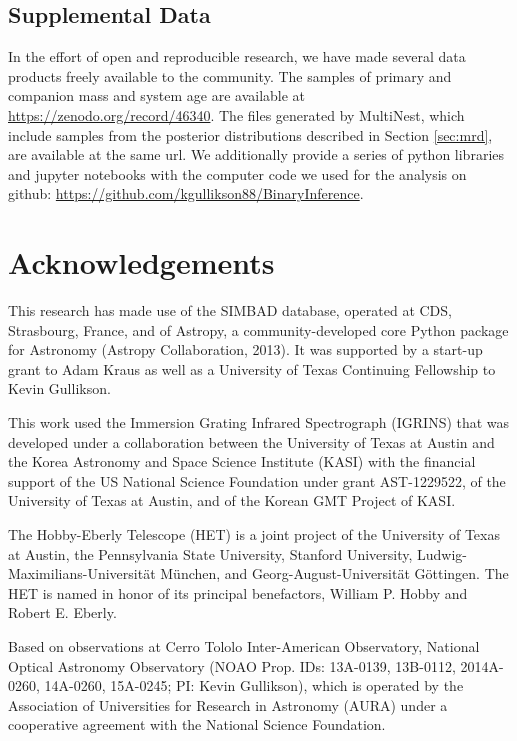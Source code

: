 \documentclass{emulateapj}
\begin{document}
\subsection{Supplemental Data}

In the effort of open and reproducible research, we have made several data products freely available to the community. The samples of primary and companion mass and system age are available at \url{https://zenodo.org/record/46340}. The files generated by MultiNest, which include samples from the posterior distributions described in Section \ref{sec:mrd}, are available at the same url. We additionally provide a series of python libraries and jupyter notebooks with the computer code we used for the analysis on github: \url{https://github.com/kgullikson88/BinaryInference}.




\section*{Acknowledgements}
This research has made use of the SIMBAD database, operated at CDS, Strasbourg, France, and of Astropy, a community-developed core Python package for Astronomy (Astropy Collaboration, 2013).
It was supported by a start-up grant to Adam Kraus as well as a University of Texas Continuing Fellowship to Kevin Gullikson.

This work used the Immersion Grating Infrared Spectrograph (IGRINS) that was developed under a collaboration between the University of Texas at Austin and the Korea Astronomy and Space Science Institute (KASI) with the financial support of the US National Science Foundation under grant AST-1229522, of the University of Texas at Austin, and of the Korean GMT Project of KASI.

The Hobby-Eberly Telescope (HET) is a joint project of the University of Texas at Austin, the Pennsylvania State University, Stanford University, Ludwig-Maximilians-Universit\"at M\"unchen, and Georg-August-Universit\"at G\"ottingen. The HET is named in honor of its principal benefactors, William P. Hobby and Robert E. Eberly.

Based on observations at Cerro Tololo Inter-American Observatory, National Optical Astronomy Observatory (NOAO Prop. IDs: 13A-0139, 13B-0112, 2014A-0260, 14A-0260, 15A-0245; PI: Kevin Gullikson), which is operated by the Association of Universities for Research in Astronomy (AURA) under a cooperative agreement with the National Science Foundation. 
\end{document}
